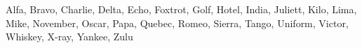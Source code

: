 \documentclass[12pt]{extarticle}
\begin{document}
\pagestyle{empty}
\color{white}
\parindent=0cm
\noindent\footnotesize
Alfa, Bravo, Charlie, Delta, Echo,
Foxtrot, Golf, Hotel, India, Juliett,
Kilo, Lima, Mike, November, Oscar,
Papa, Quebec, Romeo, Sierra,
Tango, Uniform, Victor, Whiskey,
X-ray, Yankee, Zulu
\end{document}
